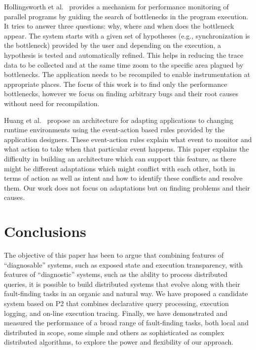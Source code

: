 \documentclass{sig-alt-full}
\begin{document}
Hollingsworth et al.~\cite{Hollingsworth_sc_1995} provides a mechanism for performance
monitoring of parallel programs by guiding the search of bottlenecks in
the program execution. It tries to answer three questions: why, where
and when does the bottleneck appear. The system starts with a given
set of hypotheses (e.g., synchronization is the bottleneck) provided by the user and depending
on the execution, a hypothesis is tested and automatically refined. This helps 
in reducing the trace data to be collected and at the same time zoom to the specific
area plagued by bottlenecks. The application needs to be recompiled to enable
instrumentation at appropriate places. The focus of this work is to find only the performance 
bottlenecks, however we focus on finding arbitrary
bugs and their root causes without need for recompilation.

Huang et al.~\cite{Huang_hpdc_2005} propose an architecture for adapting
applications to changing runtime environments using the event-action
based rules provided by the application designers. These event-action
rules explain what event to monitor and what action to take when that
particular event happens. This paper explains the difficulty in
building an architecture which can support this feature, as there
might be different adaptations which might conflict with each other,
both in terms of action as well as intent and how to identify these
conflicts and resolve them. Our work does not focus
on adaptations but on finding problems and their causes.

\section{Conclusions}
\label{sec:conclusion}

The objective of this paper has been to argue that combining features of
``diagnosable'' systems, such as exposed state and execution
transparency, with features of ``diagnostic'' systems, such as the
ability to process distributed queries, it is possible to build
distributed systems that evolve along with their fault-finding tasks in
an organic and natural way.  We have proposed a candidate system based
on P2 that combines declarative query processing, execution logging,
and on-line execution tracing.  Finally, we have demonstrated and
measured the performance of a broad range of fault-finding tasks, both
local and distributed in scope, some simple and others as sophisticated
as complex distributed algorithms, to explore the power and flexibility
of our approach.
\end{document}
